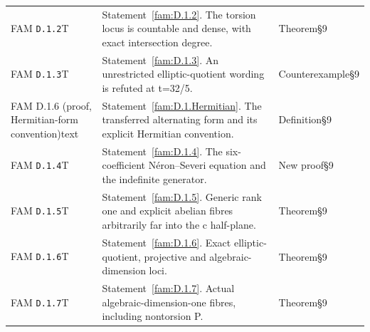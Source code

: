 \begin{longtable}{@{}L{.18\linewidth}L{.48\linewidth}L{.29\linewidth}@{}}
FAM \nolinkurl{D.1.2}\newline T & Statement~\ref{fam:D.1.2}. The torsion locus is countable and dense, with exact intersection degree.\newline {} & Theorem\newline §9\\
FAM \nolinkurl{D.1.3}\newline T & Statement~\ref{fam:D.1.3}. An unrestricted elliptic-quotient wording is refuted at t=32/\allowbreak{}5.\newline {} & Counterexample\newline §9\\
FAM D.1.6 (proof, Hermitian-form convention)\newline text & Statement~\ref{fam:D.1.Hermitian}. The transferred alternating form and its explicit Hermitian convention.\newline {} & Definition\newline §9\\
FAM \nolinkurl{D.1.4}\newline T & Statement~\ref{fam:D.1.4}. The six-coefficient Néron--Severi equation and the indefinite generator.\newline {} & New proof\newline §9\\
FAM \nolinkurl{D.1.5}\newline T & Statement~\ref{fam:D.1.5}. Generic rank one and explicit abelian fibres arbitrarily far into the c half-plane.\newline {} & Theorem\newline §9\\
FAM \nolinkurl{D.1.6}\newline T & Statement~\ref{fam:D.1.6}. Exact elliptic-quotient, projective and algebraic-dimension loci.\newline {} & Theorem\newline §9\\
FAM \nolinkurl{D.1.7}\newline T & Statement~\ref{fam:D.1.7}. Actual algebraic-dimension-one fibres, including nontorsion P.\newline {} & Theorem\newline §9\\

\end{longtable}
